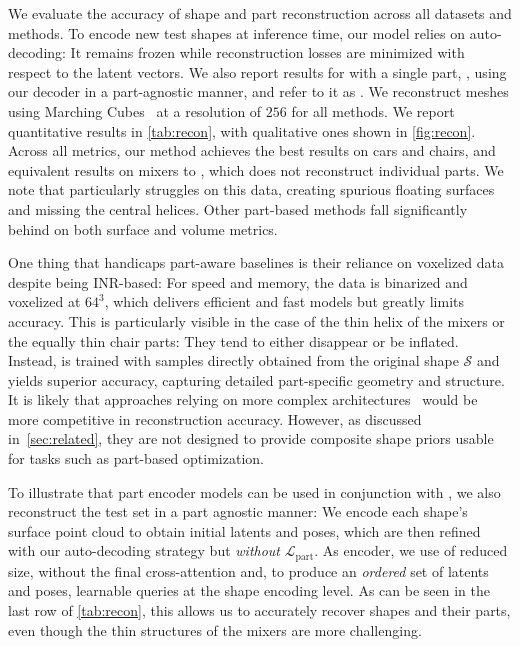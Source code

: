 We evaluate the accuracy of shape and part reconstruction across all datasets and methods. To encode new test shapes at inference time, our model relies on auto-decoding: It remains frozen while reconstruction losses are minimized with respect to the latent vectors. We also report results for \PSDF{} with a single part, \ie, using our decoder in a part-agnostic manner, and refer to it as \DSDFp{}. We reconstruct meshes using Marching Cubes~\cite{Lorensen87, Lewiner03} at a resolution of $256$ for all methods. We report quantitative results in \cref{tab:recon}, with qualitative ones shown in \cref{fig:recon}. Across all metrics, our method achieves the best results on cars and chairs, and equivalent results on mixers to \DSDFp{}, which does not reconstruct individual parts. We note that \VecSet{} particularly struggles on this data, creating spurious floating surfaces and missing the central helices. Other part-based methods fall significantly behind on both surface and volume metrics.

One thing that handicaps part-aware baselines is their reliance on voxelized data despite being INR-based: For speed and memory, the data is binarized and voxelized at $64^3$, which delivers efficient and fast models but greatly limits accuracy. This is particularly visible in the case of the thin helix of the mixers or the equally thin chair parts: They tend to either disappear or be inflated. Instead, \PSDF{} is trained with samples directly obtained from the original shape $\mathcal{S}$ and yields superior accuracy, capturing detailed part-specific geometry and structure.
It is likely that approaches relying on more complex architectures~\cite{Deng22b,Hertz22,Li24c} would be more competitive in reconstruction accuracy. However, as discussed in~\cref{sec:related}, they are not designed to provide composite shape priors  usable for tasks such as part-based optimization.

To illustrate that part encoder models can be used in conjunction with \PSDF{}, we also reconstruct the test set in a part agnostic manner: We encode each shape's surface point cloud to obtain initial latents and poses, which are then refined with our auto-decoding strategy but \textit{without} $\mathcal{L}_\text{part}$. As encoder, we use \VecSet{} of reduced size, without the final cross-attention and, to produce an \textit{ordered} set of latents and poses, learnable queries at the shape encoding level.  As can be seen in the last row of \cref{tab:recon}, this allows us to accurately recover shapes and their parts, even though the thin structures of the mixers are more challenging.


